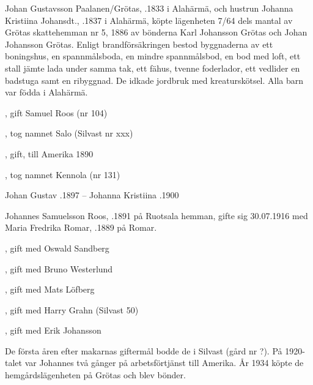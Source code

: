 Johan Gustavsson Paalanen/Grötas, .1833 i Alahärmä, och hustrun Johanna Kristiina Johansdt., .1837 i Alahärmä, köpte lägenheten 7/64 dels mantal av Grötas skattehemman  nr 5, 1886 av bönderna Karl Johansson Grötas och Johan Johansson Grötas. Enligt brandförsäkringen bestod byggnaderna av ett boningshus, en spannmålsboda, en mindre spannmålsbod, en bod med loft, ett stall jämte lada under samma tak, ett fähus, tvenne foderlador, ett vedlider en badstuga samt en ribyggnad. De idkade jordbruk med kreaturskötsel. Alla barn var födda i Alahärmä.
\begin{jhchildren}
  \item {}
  \item {}, gift Samuel Roos (nr 104)
  \item {}, tog namnet Salo (Silvast nr xxx)
  \item {}, gift, till Amerika 1890
  \item {}
  \item {}, tog namnet Kennola (nr 131)
\end{jhchildren}
Johan Gustav .1897  --  Johanna Kristiina .1900



Johannes Samuelsson Roos, .1891 på Ruotsala hemman, gifte sig 30.07.1916 med Maria Fredrika Romar, .1889 på Romar.
\begin{jhchildren}
  \item {}, gift med Oswald Sandberg
  \item {}, gift med Bruno Westerlund
  \item {}, gift med Mats Löfberg
  \item {}, gift med Harry Grahn (Silvast 50)
  \item {}, gift med Erik Johansson
\end{jhchildren}
De första åren efter makarnas giftermål bodde de i Silvast (gård nr ?). På 1920-talet var Johannes två gånger på arbetsförtjänst till Amerika. År 1934 köpte de hemgårdslägenheten på Grötas och blev bönder.

